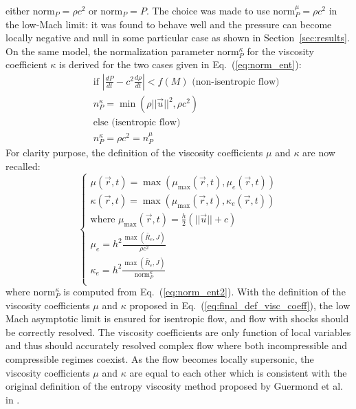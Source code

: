 \documentclass[preprint,10pt]{elsarticle}
\newcommand{\norm}{\textrm{norm}}
\newcommand{\resi}{R_e}
\newcommand{\eqt}[1]{Eq.~(\ref{#1})}                     %
\newcommand{\sct}[1]{Section~\ref{#1}}                   %
\begin{document}
either $\norm_P = \rho c^2$ or $\norm_P = P$. The choice was made to use $\norm_P^{\mu} = \rho c^2$ in the low-Mach limit: it was found to behave well and the pressure can become locally negative and null in some particular case as shown in \sct{sec:results}. \\
On the same model, the normalization parameter $\norm_P^{\kappa}$ for the viscosity coefficient $\kappa$ is derived for the two cases given in \eqt{eq:norm_ent}:
\begin{eqnarray}  \label{eq:norm_ent2}
&&\text{if } \left| \frac{dP}{dt} - c^2 \frac{d \rho}{dt}\right| < f(M) \text{ (non-isentropic flow)}\nonumber \\
&&n_{P}^{\kappa} =\min( \rho ||\vec{u} ||^2, \rho c^2  ) \nonumber \\
&&\text{else (isentropic flow)}\\
&&n_{P}^{\kappa} = \rho c^2 = n_{P}^{\mu} \nonumber
\end{eqnarray}
For clarity purpose, the definition of the viscosity coefficients $\mu$ and $\kappa$ are now recalled:
\begin{equation}
\label{eq:final_def_visc_coeff}
\left\{
\begin{array}{l}
\mu(\vec{r},t) = \max (\mu_{\max}(\vec{r},t), \mu_e (\vec{r},t)) \\
\kappa(\vec{r},t) = \max (\mu_{\max}(\vec{r},t), \kappa_e (\vec{r},t)) \\
\text{where } \mu_{\max}(\vec{r},t) = \frac{h}{2} (||\vec{u}|| + c) \\
\mu_{e} = h^2 \frac{\max(\tilde{\resi}, J)}{\rho c^2} \\
\kappa_{e} = h^2 \frac{\max(\tilde{\resi}, J)}{\norm_P^{\kappa}} \\
\end{array}
\right.
\end{equation}
where $\norm_P^{\kappa}$ is computed from \eqt{eq:norm_ent2}. With the definition of the viscosity coefficients $\mu$ and $\kappa$ proposed in \eqt{eq:final_def_visc_coeff}, the low Mach asymptotic limit is ensured for isentropic flow, and flow with shocks should be correctly resolved. The viscosity coefficients are only function of local variables and thus should accurately resolved complex flow where both incompressible and compressible regimes coexist. As the flow becomes locally supersonic, the viscosity coefficients $\mu$ and $\kappa$ are equal to each other which is consistent with the original definition of the entropy viscosity method proposed by Guermond et al. in \cite{jlg1, jlg2}.
\end{document}
